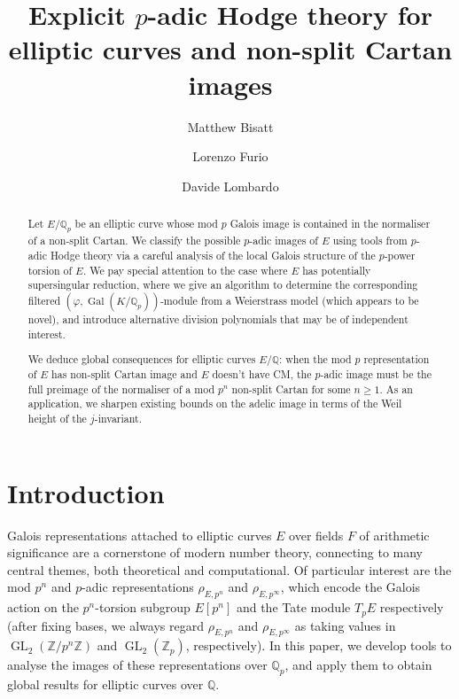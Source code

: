 \documentclass{amsart}
\title{Explicit $p$-adic Hodge theory for elliptic curves and non-split Cartan images}
\author{Matthew Bisatt}
\author{Lorenzo Furio}
\author{Davide Lombardo}
\date{}
\newcommand{\op}[1]{\operatorname{#1}}
\newcommand{\Qp}{\mathbb{Q}_p}
\theoremstyle{definition}
\newcommand{\Z}{\mathbb{Z}}
\newcommand{\Q}{\mathbb{Q}}
\newcommand{\GL}{\operatorname{GL}}
\numberwithin{theorem}{section}
\numberwithin{equation}{section}
\begin{document}
\begin{abstract}
    Let $E/\mathbb{Q}_p$ be an elliptic curve whose mod $p$ Galois image is contained in the normaliser of a non-split Cartan. We classify the possible $p$-adic images of $E$ using tools from $p$-adic Hodge theory via a careful analysis of the local Galois structure of the $p$-power torsion of $E$. We pay special attention to the case where $E$ has potentially supersingular reduction, where we give an algorithm to determine the corresponding filtered $(\varphi,\op{Gal}(K/\Qp))$-module from a Weierstrass model (which appears to be novel), and introduce alternative division polynomials that may be of independent interest.

    We deduce global consequences for elliptic curves $E/\Q$: when the mod $p$ representation of $E$ has non-split Cartan image and $E$ doesn't have CM, 
    the $p$-adic image must be the full preimage of the normaliser of a mod $p^n$ non-split Cartan for some $n \geq 1$. As an application, we sharpen existing bounds on the adelic image in terms of the Weil height of the $j$-invariant. 
\end{abstract}

\maketitle


\setcounter{tocdepth}{1}
\tableofcontents


\section{Introduction}

Galois representations attached to elliptic curves $E$ over fields $F$ of arithmetic significance are a cornerstone of modern number theory, connecting to many central themes, both theoretical and computational. Of particular interest are the mod $p^n$ and $p$-adic representations $\rho_{E,p^n}$ and $\rho_{E,p^\infty}$, which encode the Galois action on the $p^n$-torsion subgroup $E[p^n]$ and the Tate module $T_pE$ respectively (after fixing bases, we always regard $\rho_{E, p^n}$ and $\rho_{E, p^\infty}$ as taking values in $\GL_2(\Z/p^n\Z)$ and $\GL_2(\Z_p)$, respectively). In this paper, we develop tools to analyse the images of these representations over $\Q_p$, and apply them to obtain global results for elliptic curves over $\Q$.
\end{document}

